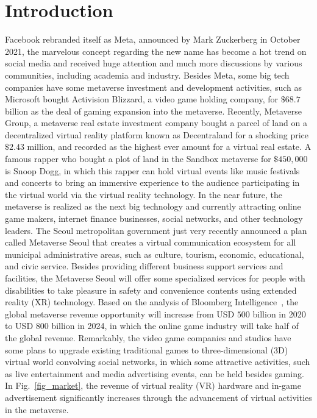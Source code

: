 \documentclass[journal]{IEEEtran}
\begin{document}
\section{Introduction}
 Facebook rebranded itself as Meta, announced by Mark Zuckerberg in October 2021, the marvelous concept regarding the new name has become a hot trend on social media and received huge attention and much more discussions by various communities, including academia and industry. 
Besides Meta, some big tech companies have some metaverse investment and development activities, such as Microsoft bought Activision Blizzard, a video game holding company, for $\$68.7$ billion as the deal of gaming expansion into the metaverse.
Recently, Metaverse Group, a metaverse real estate investment company bought a parcel of land on a decentralized virtual reality platform known as Decentraland for a shocking price $\$2.43$ million, and recorded as the highest ever amount for a virtual real estate. 
A famous rapper who bought a plot of land in the Sandbox metaverse for $\$450,000$ is Snoop Dogg, in which this rapper can hold virtual events like music festivals and concerts to bring an immersive experience to the audience participating in the virtual world via the virtual reality technology.
In the near future, the metaverse is realized as the next big technology and currently attracting online game makers, internet finance businesses, social networks, and other technology leaders. 
The Seoul metropolitan government just very recently announced a plan called Metaverse Seoul that creates a virtual communication ecosystem for all municipal administrative areas, such as culture, tourism, economic, educational, and civic service.
Besides providing different business support services and facilities, the Metaverse Seoul will offer some specialized services for people with disabilities to take pleasure in safety and convenience contents using extended reality (XR) technology.
Based on the analysis of Bloomberg Intelligence~\cite{kanterman2021metaverse}, the global metaverse revenue opportunity will increase from USD $500$ billion in 2020 to USD $800$ billion in 2024, in which the online game industry will take half of the global revenue. Remarkably, the video game companies and studios have some plans to upgrade existing traditional games to three-dimensional (3D) virtual world convolving social networks, in which some attractive activities, such as live entertainment and media advertising events, can be held besides gaming.
In Fig.~\ref{fig_market}, the revenue of virtual reality (VR) hardware and in-game advertisement significantly increases through the advancement of virtual activities in the metaverse.
\end{document}
